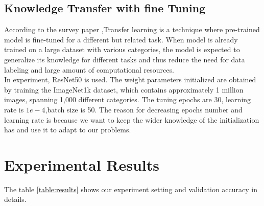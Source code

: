 \documentclass[10pt,twocolumn,letterpaper]{article}
\begin{document}
\subsection{ Knowledge Transfer with fine Tuning}
According to the survey paper \cite{DBLP:journals/corr/abs-1911-02685},Transfer learning is a technique where pre-trained model is fine-tuned for a different but related task. When model is already trained on a large dataset with various categories, the model is expected to generalize its knowledge for different tasks and thus reduce the need for data labeling and large amount of computational resources.\\
In experiment, ResNet50 is used. The weight parameters initialized are obtained by training the ImageNet1k dataset, which contains approximately 1 million images, spanning 1,000 different categories. The tuning epochs are 30, learning rate is $1e-4$,batch size is 50. The reason for decreasing epochs number and learning rate is because we want to keep the wider knowledge of the initialization has and use it to adapt to our problems.
\begin{table}[h]
\begin{center}
\end{center}
\caption{Experiment Setting and Results for proposed models.}
\label{table:results}
\end{table}

\section{Experimental Results}
The table \ref{table:results} shows our experiment setting and validation accuracy in details.
\end{document}
